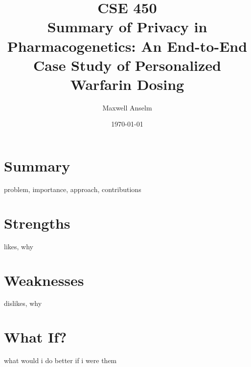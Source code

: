 \documentclass{article}
\title{CSE 450\\Summary of Privacy in Pharmacogenetics: An End-to-End Case Study
of Personalized Warfarin Dosing}
\author{Maxwell Anselm}
\date{\today}
\begin{document}
\maketitle

\section{Summary}

problem, importance, approach, contributions

\section{Strengths}

likes, why

\section{Weaknesses}

dislikes, why

\section{What If?}

what would i do better if i were them
\end{document}
